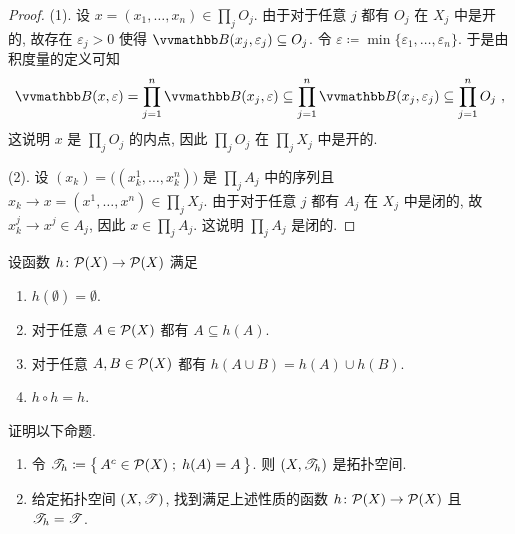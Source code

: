 \begin{proof}
    (1). 设 \(x = (x_1, \ldots, x_n) \in \prod_j O_j\). 由于对于任意 \(j\) 都有 \(O_j\) 在 \(X_j\) 中是开的, 故存在 \(\varepsilon_j > 0\) 使得 \(\B(x_j, \varepsilon_j) \subseteq O_j\). 令 \(\varepsilon \coloneqq \min\{\varepsilon_1, \ldots, \varepsilon_n\}\). 于是由积度量的定义可知
    \[
        \B(x, \varepsilon) = \prod_{j = 1}^n \B(x_j, \varepsilon) \subseteq \prod_{j = 1}^n \B(x_j, \varepsilon_j) \subseteq \prod_{j = 1}^n O_j\ ,
    \]
    这说明 \(x\) 是 \(\prod_j O_j\) 的内点, 因此 \(\prod_j O_j\) 在 \(\prod_j X_j\) 中是开的.

    (2). 设 \((x_k) = \bigl((x_k^1, \ldots, x_k^n)\bigr)\) 是 \(\prod_j A_j\) 中的序列且 \(x_k \to x = (x^1, \ldots, x^n) \in \prod_j X_j\). 由于对于任意 \(j\) 都有 \(A_j\) 在 \(X_j\) 中是闭的, 故 \(x_k^j \to x^j \in A_j\), 因此 \(x \in \prod_j A_j\). 这说明 \(\prod_j A_j\) 是闭的.
\end{proof}

\begin{exercise}
    设函数 \(h \colon \mathcal P(X) \to \mathcal P(X)\) 满足
    \begin{enumerate}
        \item \(h(\emptyset) = \emptyset\).
        \item 对于任意 \(A \in \mathcal P(X)\) 都有 \(A \subseteq h(A)\).
        \item 对于任意 \(A, B \in \mathcal P(X)\) 都有 \(h(A \cup B) = h(A) \cup h(B)\).
        \item \(h \circ h = h\).
    \end{enumerate}
    证明以下命题.
    \begin{enumerate}
        \item 令 \(\mathscr T_h \coloneqq \bigl\{\, A^c \in \mathcal P(X) \;;\; h(A) = A \,\bigr\}\). 则 \((X, \mathscr T_h)\) 是拓扑空间.
        \item 给定拓扑空间 \((X, \mathscr T)\), 找到满足上述性质的函数 \(h \colon \mathcal P(X) \to \mathcal P(X)\) 且 \(\mathscr T_h = \mathscr T\).
    \end{enumerate}
\end{exercise}

